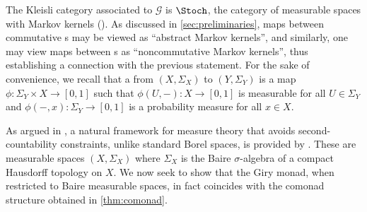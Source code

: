 The Kleisli category associated to $\mathcal{G}$ is $\Stoch$, the category of measurable spaces with Markov kernels (\cite[Section I.4]{giry82probability}).
As discussed in \cref{sec:preliminaries}, \scpu{} maps between commutative \cstars{}s may be viewed as ``abstract Markov kernels'', and similarly, one may view \scpu{} maps between \cstars{}s as ``noncommutative Markov kernels'', thus establishing a connection with the previous statement.
For the sake of convenience, we recall that a  from $(X,\Sigma_X)$ to $(Y,\Sigma_Y)$ is a map $\phi\colon \Sigma_Y \times X \to [0,1]$ such that $\phi(U,-)\colon X\to [0,1]$ is measurable for all $U\in \Sigma_Y$ and $\phi(-,x)\colon \Sigma_Y\to [0,1]$ is a probability measure for all $x\in X$.\label{def:mkernel}

As argued in \cite{jamneshan23foundational}, a natural framework for measure theory that avoids second-countability constraints, unlike standard Borel spaces, is provided by . These are measurable spaces $(X,\Sigma_X)$ where $\Sigma_X$ is the Baire $\sigma$-algebra of a compact Hausdorff topology on $X$.
We now seek to show that the Giry monad, when restricted to Baire measurable spaces, in fact coincides with the comonad structure obtained in \cref{thm:comonad}. 

